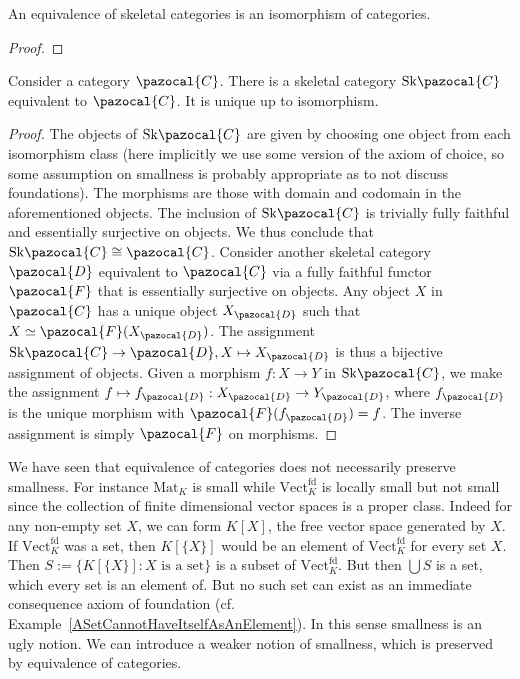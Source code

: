     \begin{lemma}
        An equivalence of skeletal categories is an isomorphism of categories. 
    \end{lemma}
    \begin{proof}
        
    \end{proof}
    \begin{proposition}
        Consider a category $\pazocal{C}$. There is a skeletal category $\mathrm{Sk}\pazocal{C}$ equivalent to $\pazocal{C}$. It is unique up to isomorphism.   
    \end{proposition}
    \begin{proof}
        The objects of $\mathrm{Sk}\pazocal{C}$ are given by choosing one object from each isomorphism class (here implicitly we use some version of the axiom of choice, so some assumption on smallness is probably appropriate as to not discuss foundations). The morphisms are those with domain and codomain in the aforementioned objects. The inclusion of $\mathrm{Sk}\pazocal{C}$ is trivially fully faithful and essentially surjective on objects. We thus conclude that $\mathrm{Sk}\pazocal{C}\cong \pazocal{C}$. Consider another skeletal category $\pazocal{D}$ equivalent to $\pazocal{C}$ via a fully faithful functor $\pazocal{F}$ that is essentially surjective on objects. Any object $X$ in $\pazocal{C}$ has a unique object $X_\pazocal{D}$ such that $X\simeq \pazocal{F}(X_\pazocal{D})$. The assignment $\mathrm{Sk}\pazocal{C}\rightarrow \pazocal{D}, X \mapsto X_{\pazocal{D}}$ is thus a bijective assignment of objects. Given a morphism $f: X \rightarrow Y$ in $\mathrm{Sk}\pazocal{C}$, we make the assignment $f\mapsto f_\pazocal{D} : X_\pazocal{D}\rightarrow Y_\pazocal{D}$, where $f_\pazocal{D}$ is the unique morphism with $\pazocal{F}(f_{\pazocal{D}})=f$. The inverse assignment is simply $\pazocal{F}$ on morphisms.  
    \end{proof}
    We have seen that equivalence of categories does not necessarily preserve smallness. For instance $\mathrm{Mat}_K$ is small while $\mathrm{Vect}_K^\mathrm{fd}$ is locally small but not small since the collection of finite dimensional vector spaces is a proper class. Indeed for any non-empty set $X$, we can form $K[X]$, the free vector space generated by $X$. If $\mathrm{Vect}_K^\mathrm{fd}$ was a set, then $K[\{X\}]$ would be an element of $\mathrm{Vect}_K^\mathrm{fd}$ for every set $X$. Then $S:=\{K[\{X\}] : X \text{ is a set}\}$ is a subset of $\mathrm{Vect}_K^\mathrm{fd}$. But then $ \bigcup S$ is a set, which every set is an element of. But no such set can exist as an immediate consequence axiom of foundation (cf. Example~\ref{ASetCannotHaveItselfAsAnElement}). In this sense smallness is an ugly notion. We can introduce a weaker notion of smallness, which is preserved by equivalence of categories. 
